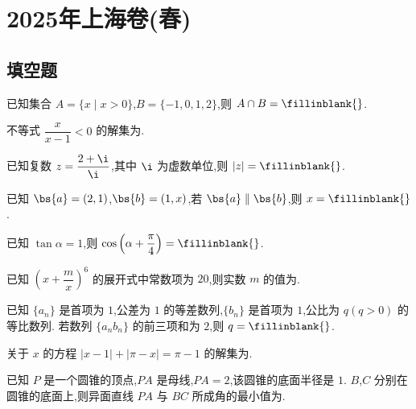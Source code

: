 \chapter{2025年上海卷(春)}

\section{填空题}

\begin{problem}
已知集合 \(A=\{x\mid x>0\}\),\(B=\{-1,0,1,2\}\),则 \(A\cap B=\fillinblank{}\).
\end{problem}

\begin{problem}
不等式 \(\dfrac{x}{x-1}<0\) 的解集为\fillinblank{}.
\end{problem}

\begin{problem}
已知复数 \(z=\dfrac{2+\i}{\i}\),其中 \(\i\) 为虚数单位,则 \(|z|=\fillinblank{}\).
\end{problem}

\begin{problem}
已知 \(\bs{a}=(2,1)\),\(\bs{b}=(1,x)\),若 \(\bs{a}\parallel\bs{b}\),则 \(x=\fillinblank{}\).
\end{problem}

\begin{problem}
已知 \(\tan\alpha=1\),则 \(\cos\left(\alpha+\dfrac{\pi}{4}\right)=\fillinblank{}\).
\end{problem}

\begin{problem}
已知 \(\left(x+\dfrac{m}{x}\right)^6\) 的展开式中常数项为 \(20\),则实数 \(m\) 的值为\fillinblank{}.
\end{problem}

\begin{problem}
已知 \(\{a_n\}\) 是首项为 \(1\),公差为 \(1\) 的等差数列,\(\{b_n\}\) 是首项为 \(1\),公比为 \(q(q>0)\) 的等比数列. 若数列 \(\{a_nb_n\}\) 的前三项和为 \(2\),则 \(q=\fillinblank{}\).
\end{problem}

\begin{problem}
关于 \(x\) 的方程 \(|x-1|+|\pi-x|=\pi-1\) 的解集为\fillinblank{}.
\end{problem}

\begin{problem}
已知 \(P\) 是一个圆锥的顶点,\(PA\) 是母线,\(PA=2\),该圆锥的底面半径是 \(1\). \(B\),\(C\) 分别在圆锥的底面上,则异面直线 \(PA\) 与 \(BC\) 所成角的最小值为\fillinblank{}.
\end{problem}

